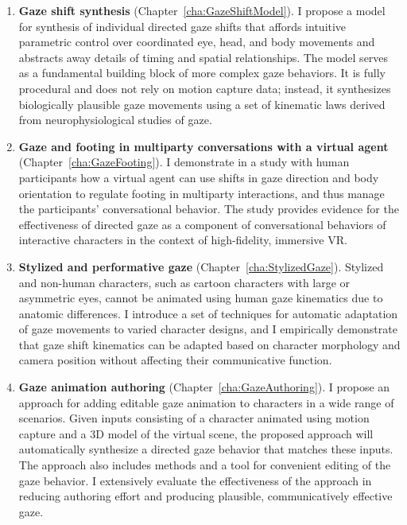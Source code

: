 \begin{enumerate}
\item \textbf{Gaze shift synthesis} (Chapter~\ref{cha:GazeShiftModel}). I propose a model for synthesis of individual directed gaze shifts that affords intuitive parametric control over coordinated eye, head, and body movements and abstracts away details of timing and spatial relationships. The model serves as a fundamental building block of more complex gaze behaviors. It is fully procedural and does not rely on motion capture data; instead, it synthesizes biologically plausible gaze movements using a set of kinematic laws derived from neurophysiological studies of gaze.
\item \textbf{Gaze and footing in multiparty conversations with a virtual agent} (Chapter~\ref{cha:GazeFooting}). I demonstrate in a study with human participants how a virtual agent can use shifts in gaze direction and body orientation to regulate footing in multiparty interactions, and thus manage the participants' conversational behavior. The study provides evidence for the effectiveness of directed gaze as a component of conversational behaviors of interactive characters in the context of high-fidelity, immersive VR.
\item \textbf{Stylized and performative gaze} (Chapter~\ref{cha:StylizedGaze}). Stylized and non-human characters, such as cartoon characters with large or asymmetric eyes, cannot be animated using human gaze kinematics due to anatomic differences. I introduce a set of techniques for automatic adaptation of gaze movements to varied character designs, and I empirically demonstrate that gaze shift kinematics can be adapted based on character morphology and camera position without affecting their communicative function.
\item \textbf{Gaze animation authoring} (Chapter~\ref{cha:GazeAuthoring}). I propose an approach for adding editable gaze animation to characters in a wide range of scenarios. Given inputs consisting of a character animated using motion capture and a 3D model of the virtual scene, the proposed approach will automatically synthesize a directed gaze behavior that matches these inputs. The approach also includes methods and a tool for convenient editing of the gaze behavior. I extensively evaluate the effectiveness of the approach in reducing authoring effort and producing plausible, communicatively effective gaze.
\end{enumerate}

